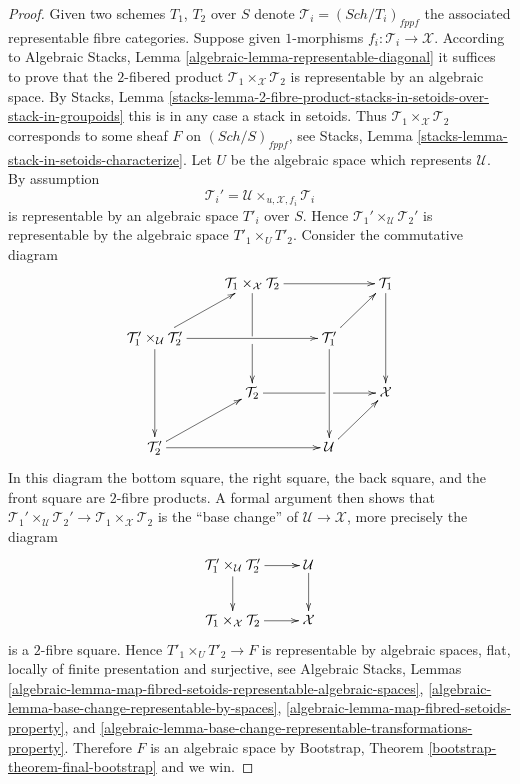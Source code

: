 \documentclass{stacks-project}
\theoremstyle{plain}
\theoremstyle{definition}
\theoremstyle{remark}
\numberwithin{equation}{subsection}
\def\Sch{\mathit{Sch}}
\begin{document}
\begin{proof}
Given two schemes $T_1$, $T_2$ over $S$ denote
$\mathcal{T}_i = (\Sch/T_i)_{fppf}$ the associated representable
fibre categories. Suppose given $1$-morphisms
$f_i : \mathcal{T}_i \to \mathcal{X}$.
According to
Algebraic Stacks, Lemma \ref{algebraic-lemma-representable-diagonal}
it suffices to prove that the $2$-fibered
product $\mathcal{T}_1 \times_\mathcal{X} \mathcal{T}_2$
is representable by an algebraic space. By
Stacks, Lemma
\ref{stacks-lemma-2-fibre-product-stacks-in-setoids-over-stack-in-groupoids}
this is in any case a stack in setoids. Thus
$\mathcal{T}_1 \times_\mathcal{X} \mathcal{T}_2$ corresponds
to some sheaf $F$ on $(\Sch/S)_{fppf}$, see
Stacks, Lemma \ref{stacks-lemma-stack-in-setoids-characterize}.
Let $U$ be the algebraic space which represents $\mathcal{U}$.
By assumption
$$
\mathcal{T}_i' = \mathcal{U} \times_{u, \mathcal{X}, f_i} \mathcal{T}_i
$$
is representable by an algebraic space $T'_i$ over $S$. Hence
$\mathcal{T}_1' \times_\mathcal{U} \mathcal{T}_2'$ is representable
by the algebraic space $T'_1 \times_U T'_2$.
Consider the commutative diagram
$$
\xymatrix{
&
\mathcal{T}_1 \times_{\mathcal X} \mathcal{T}_2 \ar[rr]\ar'[d][dd] & &
\mathcal{T}_1 \ar[dd] \\
\mathcal{T}_1' \times_\mathcal{U} \mathcal{T}_2' \ar[ur]\ar[rr]\ar[dd] & &
\mathcal{T}_1' \ar[ur]\ar[dd] \\
&
\mathcal{T}_2 \ar'[r][rr] & &
\mathcal X \\
\mathcal{T}_2' \ar[rr]\ar[ur] & &
\mathcal{U} \ar[ur] }
$$
In this diagram the bottom square, the right square, the back square, and
the front square are $2$-fibre products. A formal argument then shows
that $\mathcal{T}_1' \times_\mathcal{U} \mathcal{T}_2' \to
\mathcal{T}_1 \times_{\mathcal X} \mathcal{T}_2$
is the ``base change'' of $\mathcal{U} \to \mathcal{X}$, more precisely
the diagram
$$
\xymatrix{
\mathcal{T}_1' \times_\mathcal{U} \mathcal{T}_2' \ar[d] \ar[r] &
\mathcal{U} \ar[d] \\
\mathcal{T}_1 \times_{\mathcal X} \mathcal{T}_2 \ar[r] &
\mathcal{X}
}
$$
is a $2$-fibre square.
Hence $T'_1 \times_U T'_2 \to F$ is representable by algebraic spaces,
flat, locally of finite presentation and surjective, see
Algebraic Stacks, Lemmas
\ref{algebraic-lemma-map-fibred-setoids-representable-algebraic-spaces},
\ref{algebraic-lemma-base-change-representable-by-spaces},
\ref{algebraic-lemma-map-fibred-setoids-property}, and
\ref{algebraic-lemma-base-change-representable-transformations-property}.
Therefore $F$ is an algebraic space by
Bootstrap, Theorem \ref{bootstrap-theorem-final-bootstrap}
and we win.
\end{proof}
\end{document}
